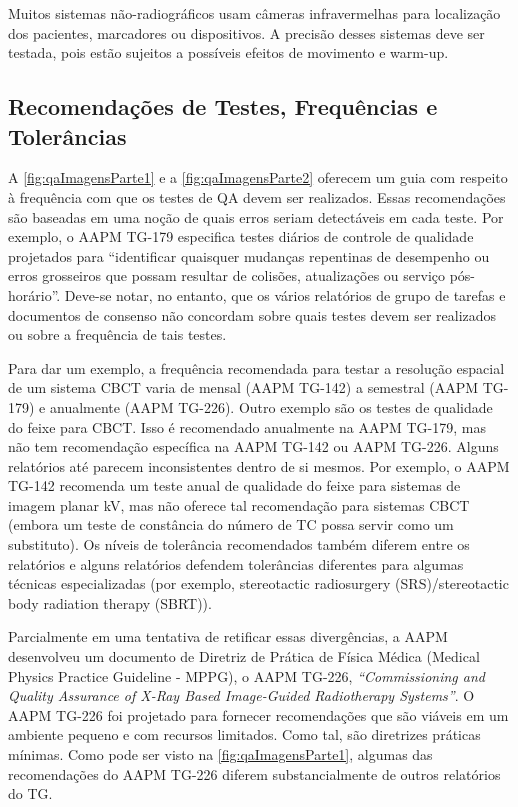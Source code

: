 \documentclass[11pt,a4paper]{article}
\newcounter{exemplo}
\begin{document}
    Muitos sistemas não-radiográficos usam câmeras infravermelhas para localização dos pacientes, marcadores ou dispositivos. A precisão desses sistemas deve ser testada, pois estão sujeitos a possíveis efeitos de movimento e warm-up.

\subsection*{Recomendações de Testes, Frequências e Tolerâncias}

    A \ref{fig:qaImagensParte1} e a \ref{fig:qaImagensParte2} oferecem um guia com respeito à frequência com que os testes de QA devem ser realizados. Essas recomendações são baseadas em uma noção de quais erros seriam detectáveis em cada teste. Por exemplo, o AAPM TG-179 especifica testes diários de controle de qualidade projetados para “identificar quaisquer mudanças repentinas de desempenho ou erros grosseiros que possam resultar de colisões, atualizações ou serviço pós-horário”. Deve-se notar, no entanto, que os vários relatórios de grupo de tarefas e documentos de consenso não concordam sobre quais testes devem ser realizados ou sobre a frequência de tais testes.

    Para dar um exemplo, a frequência recomendada para testar a resolução espacial de um sistema CBCT varia de mensal (AAPM TG-142) a semestral (AAPM TG-179) e anualmente (AAPM TG-226). Outro exemplo são os testes de qualidade do feixe para CBCT. Isso é recomendado anualmente na AAPM TG-179, mas não tem recomendação específica na AAPM TG-142 ou AAPM TG-226. Alguns relatórios até parecem inconsistentes dentro de si mesmos. Por exemplo, o AAPM TG-142 recomenda um teste anual de qualidade do feixe para sistemas de imagem planar kV, mas não oferece tal recomendação para sistemas CBCT (embora um teste de constância do número de TC possa servir como um substituto). Os níveis de tolerância recomendados também diferem entre os relatórios e alguns relatórios defendem tolerâncias diferentes para algumas técnicas especializadas (por exemplo, stereotactic radiosurgery (SRS)/stereotactic body radiation therapy (SBRT)). 
    
    Parcialmente em uma tentativa de retificar essas divergências, a AAPM desenvolveu um documento de Diretriz de Prática de Física Médica (Medical Physics Practice Guideline - MPPG), o AAPM TG-226, \textit{``Commissioning and Quality Assurance of X-Ray Based Image-Guided Radiotherapy Systems''}. O AAPM TG-226 foi projetado para fornecer recomendações que são viáveis em um ambiente pequeno e com recursos limitados. Como tal, são diretrizes práticas mínimas. Como pode ser visto na \ref{fig:qaImagensParte1}, algumas das recomendações do AAPM TG-226 diferem substancialmente de outros relatórios do TG. 
\end{document}
